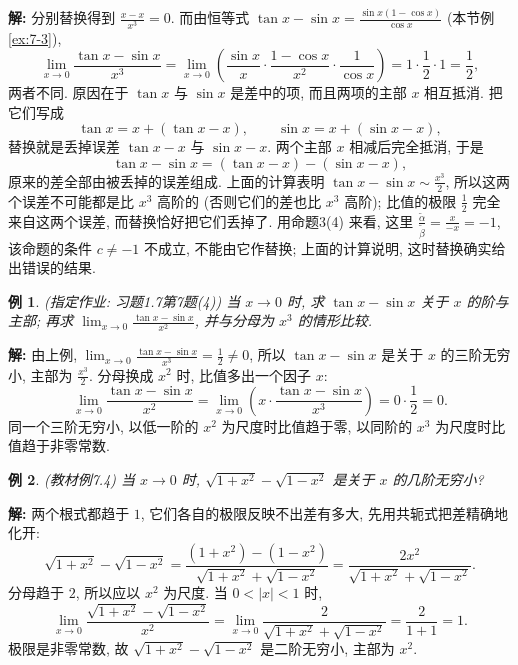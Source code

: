\documentclass[UTF8,openany]{ctexbook}
\theoremstyle{chinesetextbook}
\newtheorem{example}{例}[section]
\newenvironment{cnsolution}{\par\indent\textbf{解:} \ignorespaces}{\par}
\begin{document}
\begin{cnsolution}
分别替换得到 $\displaystyle\frac{x-x}{x^3}=0$. 而由恒等式 $\displaystyle\tan x-\sin x=\frac{\sin x(1-\cos x)}{\cos x}$ (本节例\ref{ex:7-3}),
\[
\lim_{x\to0}\frac{\tan x-\sin x}{x^3}=\lim_{x\to0}\left(\frac{\sin x}x\cdot\frac{1-\cos x}{x^2}\cdot\frac1{\cos x}\right)=1\cdot\frac12\cdot1=\frac12,
\]
两者不同. 原因在于 $\tan x$ 与 $\sin x$ 是差中的项, 而且两项的主部 $x$ 相互抵消. 把它们写成
\[
\tan x=x+(\tan x-x),\qquad\sin x=x+(\sin x-x),
\]
替换就是丢掉误差 $\tan x-x$ 与 $\sin x-x$. 两个主部 $x$ 相减后完全抵消, 于是
\[
\tan x-\sin x=(\tan x-x)-(\sin x-x),
\]
原来的差全部由被丢掉的误差组成. 上面的计算表明 $\displaystyle\tan x-\sin x\sim\frac{x^3}2$, 所以这两个误差不可能都是比 $x^3$ 高阶的 (否则它们的差也比 $x^3$ 高阶); 比值的极限 $\displaystyle\frac12$ 完全来自这两个误差, 而替换恰好把它们丢掉了. 用命题3(4) 来看, 这里 $\displaystyle\frac{\widetilde\alpha}{\widetilde\beta}=\frac x{-x}=-1$, 该命题的条件 $c\ne-1$ 不成立, 不能由它作替换; 上面的计算说明, 这时替换确实给出错误的结果.
\end{cnsolution}
\begin{example}
\textnormal{(指定作业: 习题1.7第7题(4))} 当 $x\to0$ 时, 求 $\tan x-\sin x$ 关于 $x$ 的阶与主部; 再求 $\displaystyle\lim_{x\to0}\frac{\tan x-\sin x}{x^2}$, 并与分母为 $x^3$ 的情形比较.
\end{example}
\begin{cnsolution}
由上例, $\displaystyle\lim_{x\to0}\frac{\tan x-\sin x}{x^3}=\frac12\ne0$, 所以 $\tan x-\sin x$ 是关于 $x$ 的三阶无穷小, 主部为 $\displaystyle\frac{x^3}2$. 分母换成 $x^2$ 时, 比值多出一个因子 $x$:
\[
\lim_{x\to0}\frac{\tan x-\sin x}{x^2}=\lim_{x\to0}\left(x\cdot\frac{\tan x-\sin x}{x^3}\right)=0\cdot\frac12=0.
\]
同一个三阶无穷小, 以低一阶的 $x^2$ 为尺度时比值趋于零, 以同阶的 $x^3$ 为尺度时比值趋于非零常数.
\end{cnsolution}
\begin{example}
\textnormal{(教材例7.4)} 当 $x\to0$ 时, $\sqrt{1+x^2}-\sqrt{1-x^2}$ 是关于 $x$ 的几阶无穷小?
\end{example}
\begin{cnsolution}
两个根式都趋于 $1$, 它们各自的极限反映不出差有多大, 先用共轭式把差精确地化开:
\[
\sqrt{1+x^2}-\sqrt{1-x^2}=\frac{(1+x^2)-(1-x^2)}{\sqrt{1+x^2}+\sqrt{1-x^2}}=\frac{2x^2}{\sqrt{1+x^2}+\sqrt{1-x^2}}.
\]
分母趋于 $2$, 所以应以 $x^2$ 为尺度. 当 $0<|x|<1$ 时,
\[
\lim_{x\to0}\frac{\sqrt{1+x^2}-\sqrt{1-x^2}}{x^2}=\lim_{x\to0}\frac2{\sqrt{1+x^2}+\sqrt{1-x^2}}=\frac2{1+1}=1.
\]
极限是非零常数, 故 $\sqrt{1+x^2}-\sqrt{1-x^2}$ 是二阶无穷小, 主部为 $x^2$.
\end{cnsolution}
\end{document}
